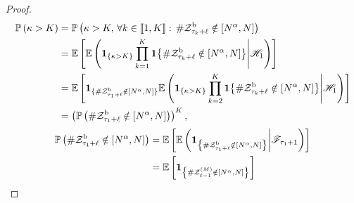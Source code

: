 \begin{proof}
    \begin{align*}
        \mathbb P\left(
            \kappa>K
        \right)
        &
        =
        \mathbb P\left(
            \kappa>K,\,
            \forall k\in[\![1,K]\!]:\,
            \#\mathcal Z^{\mathrm b}_{\tau_k+\ell}
            \notin[N^\alpha,N]
        \right)
        \\ &
        =
        \mathbb E\left[
            \mathbb E\left(
                {\bf 1}_{\{\kappa>K\}}
                \prod_{k=1}^K
                {\bf 1}{
                    \left\{
                        \#\mathcal Z^{\mathrm b}_{\tau_k+\ell}
                        \notin[N^\alpha,N]
                    \right\}
                }
                \middle|
                \mathscr H_1
            \right)
        \right]
        \\ &
        =
        \mathbb E\left[
            {\bf 1}_{\{
                \#\mathcal Z^{\mathrm b}_{\tau_1+\ell}
                \notin[N^\alpha,N]
            \}}
            \mathbb E\left(
                {\bf 1}_{\{\kappa>K\}}
                \prod_{k=2}^K
                {\bf 1}{
                    \left\{
                        \#\mathcal Z^{\mathrm b}_{\tau_k+\ell}
                        \notin[N^\alpha,N]
                    \right\}
                }
                \middle|
                \mathscr H_1
            \right)
        \right]
        \\ &
        =
        \left(
            \mathbb P\left(
                \#\mathcal Z^{\mathrm b}_{\tau_1+\ell}
                \notin[N^\alpha,N]
            \right)
        \right)^K,
    \end{align*}
    \begin{align*}
        \mathbb P\left(
            \#\mathcal Z^{\mathrm b}_{\tau_1+\ell}
            \notin[N^\alpha,N]
        \right)
        &
        =
        \mathbb E\left[
            \mathbb E\left(
                {\bf 1}_{
                    \left\{
                        \#\mathcal Z^{\mathrm b}_{\tau_1+\ell}
                        \notin[N^\alpha,N]
                    \right\}
                }
                \middle|
                \mathscr F_{\tau_1+1}
            \right)
        \right]
        \\ &
        =
        \mathbb E\left[
            {\bf 1}_{
                \left\{
                    \#\mathcal Z^{(M)}_{\ell-1}
                    \notin[N^\alpha,N]
                \right\}
            }
        \right]

\end{align*}
\end{proof}
